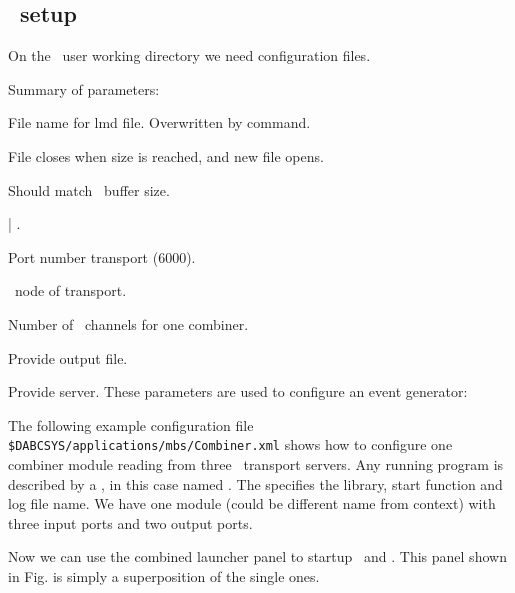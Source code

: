 {\subsection[DABC setup]{\dabc\ setup}
On the \dabc\ user working directory we need configuration files.

Summary of parameters:
\bdes
\item[MbsFileName] File name for lmd file. Overwritten by command.
\item[MbsFileSizeLimit] File closes when size is reached, and new file opens.
\item[BufferSize] Should match \mbs\ buffer size.
\item[MbsServerKind]  | .
\item[MbsServerPort] Port number transport (6000).
\item[MbsServerName] \mbs\ node of transport.
\item[NumInputs] Number of \mbs\ channels for one combiner.
\item[DoFile] Provide output file.
\item[DoServer] Provide server.
\edes
These parameters are used to configure an event generator:
\bdes
\item[NumSubevents]
\item[FirstProcId]
\item[SubeventSize]
\item[Go4Random]
\edes
The following example configuration file {\tt \$DABCSYS/applications/mbs/Combiner.xml} shows how to 
configure one combiner module reading from three \mbs\ transport servers.
Any running program is described by a , in this case
named . The  specifies the
library, start function and log file name.
We have one module  (could be different name from context) 
with three input ports and two output ports.

Now we can use the combined launcher panel to startup \mbs\ and \dabc.
This panel shown in Fig. \pageref{fig:user-gui-pan-dabcmbs} is simply a superposition of the single ones.
}
